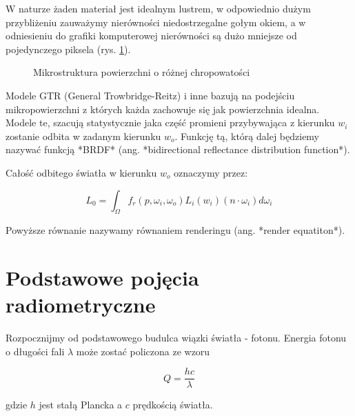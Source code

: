 \documentclass[../main.tex]{subfiles}
\begin{document}
W naturze żaden materiał jest idealnym lustrem, w odpowiednio dużym
przybliżeniu zauważymy nierówności niedostrzegalne gołym okiem, a w odniesieniu
do grafiki komputerowej nierówności są dużo mniejsze od pojedynczego piksela
(rys. \ref{fig:Microstructure}).

\begin{figure}[h]
  \centering
  \vspace{0.25cm}
  \caption{Mikrostruktura powierzchni o różnej chropowatości}
	\label{fig:Microstructure}
\end{figure}

Modele GTR (General Trowbridge-Reitz) i inne bazują na podejściu
mikropowierzchni z których każda zachowuje się jak powierzchnia idealna. Modele
te, szacują statystycznie jaka część promieni przybywająca z kierunku $w_i$
zostanie odbita w zadanym kierunku $w_o$. Funkcję tą, którą dalej będziemy
nazywać funkcją *BRDF* (ang. *bidirectional reflectance distribution
function*).

Całość odbitego światła w kierunku $w_o$ oznaczymy przez:

$$
L_0 = \int_{\Omega} {
    f_r(p, \omega_i, \omega_o)
    L_i(w_i)
    (n \cdot \omega_i)
    d \omega_i
}
$$

Powyższe równanie nazywamy równaniem renderingu (ang. *render equatiton*).

\section{Podstawowe pojęcia radiometryczne}

Rozpocznijmy od podstawowego budulca wiązki światła - fotonu. Energia fotonu
o długości fali $\lambda$ może zostać policzona ze wzoru

$$ Q = \frac{hc}{\lambda} $$

gdzie $h$ jest stałą Plancka a $c$ prędkością światła.
\end{document}
